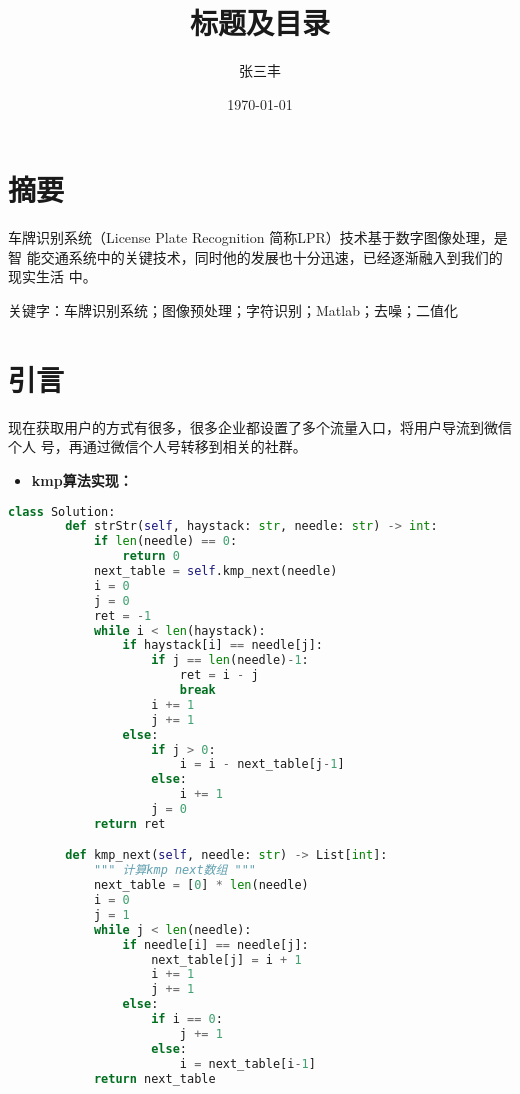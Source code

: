 \documentclass{article}
\title{标题及目录}
\author{张三丰}
\date{\today}
\begin{document}
    \maketitle
    \tableofcontents
    \newpage

    \section{摘要}
    车牌识别系统（License Plate Recognition 简称LPR）技术基于数字图像处理，是智
    能交通系统中的关键技术，同时他的发展也十分迅速，已经逐渐融入到我们的现实生活
    中。

    关键字：车牌识别系统；图像预处理；字符识别；Matlab；去噪；二值化

    \section{引言}
    现在获取用户的方式有很多，很多企业都设置了多个流量入口，将用户导流到微信个人
    号，再通过微信个人号转移到相关的社群。

    \begin{itemize}
        \item{\bfseries kmp算法实现：}
    \end{itemize}

    \begin{lstlisting}[language=Python]
    class Solution:
        def strStr(self, haystack: str, needle: str) -> int:
            if len(needle) == 0:
                return 0
            next_table = self.kmp_next(needle)
            i = 0
            j = 0
            ret = -1
            while i < len(haystack):
                if haystack[i] == needle[j]:
                    if j == len(needle)-1:
                        ret = i - j
                        break
                    i += 1
                    j += 1
                else:
                    if j > 0:
                        i = i - next_table[j-1]
                    else:
                        i += 1
                    j = 0
            return ret

        def kmp_next(self, needle: str) -> List[int]:
            """ 计算kmp next数组 """
            next_table = [0] * len(needle)
            i = 0
            j = 1
            while j < len(needle):
                if needle[i] == needle[j]:
                    next_table[j] = i + 1
                    i += 1
                    j += 1
                else:
                    if i == 0:
                        j += 1
                    else:
                        i = next_table[i-1]
            return next_table


    \end{lstlisting}
\end{document}
